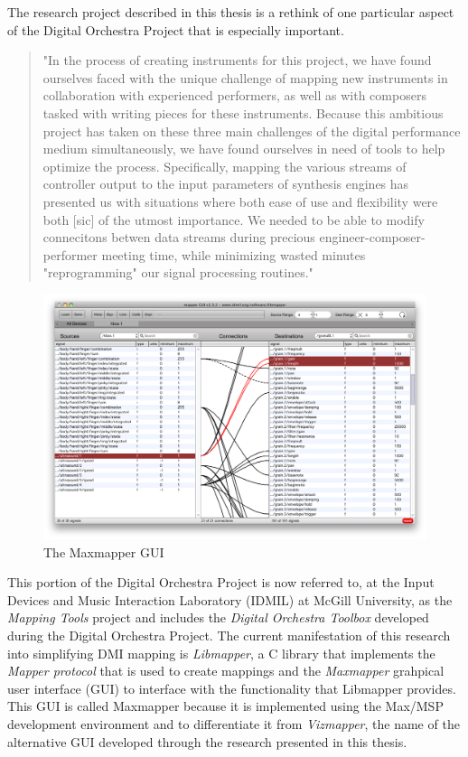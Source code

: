 The research project described in this thesis is a rethink of one particular aspect of the Digital Orchestra Project that is especially important.

\begin{quote}
"In the process of creating instruments for this project, we have found ourselves faced with the unique challenge of mapping new instruments in collaboration with experienced performers, as well as with composers tasked with writing pieces for these instruments. Because this ambitious project has taken on these three main challenges of the digital performance medium simultaneously, we have found ourselves in need of tools to help optimize the process. Specifically, mapping the various streams of controller output to the input parameters of synthesis engines has presented us with situations where both ease of use and flexibility were both [sic] of the utmost importance. We needed to be able to modify connecitons betwen data streams during precious engineer-composer-performer meeting time, while minimizing wasted minutes "reprogramming" our signal processing routines." \cite{Malloch2007}
\end{quote}

\begin{figure}[htb]
\centering
\includegraphics[width=1.0\textwidth]{maxmapper.png}
\caption{The Maxmapper GUI}
\label{fig:maxmapper}
\end{figure}

This portion of the Digital Orchestra Project is now referred to, at the Input Devices and Music Interaction Laboratory (IDMIL) at McGill University, as the \emph{Mapping Tools} project and includes the \emph{Digital Orchestra Toolbox} developed during the Digital Orchestra Project. The current manifestation of this research into simplifying DMI mapping is \emph{Libmapper}, a C library that implements the \emph{Mapper protocol} that is used to create mappings and the \emph{Maxmapper} grahpical user interface (GUI) to interface with the functionality that Libmapper provides. This GUI is called Maxmapper because it is implemented using the Max/MSP development environment and to differentiate it from \emph{Vizmapper}, the name of the alternative GUI developed through the research presented in this thesis.

